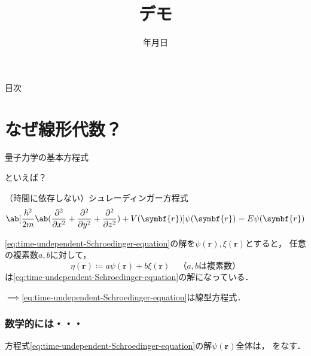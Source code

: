 \documentclass[
    10pt,
    ]{sotsu-beamer}
\begin{document}
\title{デモ}
\date{\number\year 年\number\month 月\number\day 日}


\begin{frame}

    \maketitle

\end{frame}


\begin{frame}[allowframebreaks]{目次}

    \tableofcontents

\end{frame}


\section{なぜ線形代数？}


\begin{frame}{量子力学の基本方程式}

    といえば？

    \pause

    \begin{block}{（時間に依存しない）シュレーディンガー方程式}
        \begin{equation}
            \label{eq:time-undependent-Schroedinger-equation}
            \ab[ \frac{\hbar^2}{2m} \ab( \pdv[2]{}{x} + \pdv[2]{}{y} + \pdv[2]{}{z} ) + V(\symbf{r})] \psi(\symbf{r}) = E \psi(\symbf{r})
        \end{equation}
    \end{block}

    \pause
    
    \eqref{eq:time-undependent-Schroedinger-equation}の解を$\psi(\symbf{r}), \xi(\symbf{r})$とすると，
    任意の複素数$a, b$に対して，
    \[  \eta(\symbf{r}) \coloneq a \psi(\symbf{r}) + b \xi(\symbf{r}) 
        \quad \text{（$a, b$は複素数）}  \]
    は\eqref{eq:time-undependent-Schroedinger-equation}の解になっている．

    \pause

    $\implies$\alert{\eqref{eq:time-undependent-Schroedinger-equation}は線型方程式}．

\end{frame}



\begin{frame}
    \label{frame:psi-is-vector}
    \frametitle{数学的には・・・}

    \begin{center}
        方程式\eqref{eq:time-undependent-Schroedinger-equation}の解$\psi(\symbf{r})$全体は，
        をなす．
    \end{center}

\end{frame}
\end{document}

